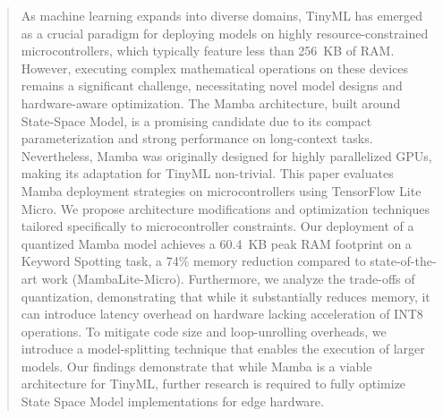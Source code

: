 \begin{abstract}
  \label{sec:abstract}

  As machine learning expands into diverse domains, TinyML has emerged as a crucial paradigm for deploying models on highly resource-constrained microcontrollers, which typically feature less than 256~KB of RAM. However, executing complex mathematical operations on these devices remains a significant challenge, necessitating novel model designs and hardware-aware optimization.
  The Mamba architecture, built around State-Space Model, is a promising candidate due to its compact parameterization and strong performance on long-context tasks. Nevertheless, Mamba was originally designed for highly parallelized GPUs, making its adaptation for TinyML non-trivial. This paper evaluates Mamba deployment strategies on microcontrollers using TensorFlow Lite Micro.
  We propose architecture modifications and optimization techniques tailored specifically to microcontroller constraints. Our deployment of a quantized Mamba model achieves a 60.4~KB peak RAM footprint on a Keyword Spotting task, a 74\% memory reduction compared to state-of-the-art work (MambaLite-Micro). Furthermore, we analyze the trade-offs of quantization, demonstrating that while it substantially reduces memory, it can introduce latency overhead on hardware lacking acceleration of INT8 operations.
  To mitigate code size and loop-unrolling overheads, we introduce a model-splitting technique that enables the execution of larger models. Our findings demonstrate that while Mamba is a viable architecture for TinyML, further research is required to fully optimize State Space Model implementations for edge hardware.

\end{abstract}